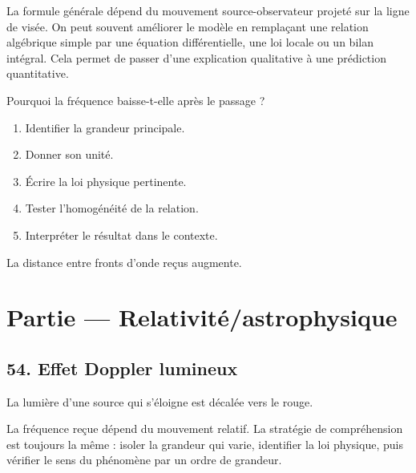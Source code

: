 \documentclass[11pt,a4paper]{article}
\begin{document}
\begin{approfondissementbox}
La formule générale dépend du mouvement source-observateur projeté sur la ligne de visée.
On peut souvent améliorer le modèle en remplaçant une relation algébrique simple par une équation différentielle, une loi locale ou un bilan intégral. Cela permet de passer d'une explication qualitative à une prédiction quantitative.
\end{approfondissementbox}

\begin{exercicebox}
Pourquoi la fréquence baisse-t-elle après le passage ?
\begin{enumerate}
  \item Identifier la grandeur principale.
  \item Donner son unité.
  \item Écrire la loi physique pertinente.
  \item Tester l'homogénéité de la relation.
  \item Interpréter le résultat dans le contexte.
\end{enumerate}
\end{exercicebox}

\begin{corrigebox}[Indication]
La distance entre fronts d'onde reçus augmente.
\end{corrigebox}


\section{Partie — Relativité/astrophysique}


\subsection{54. Effet Doppler lumineux}

\begin{exemplebox}
La lumière d'une source qui s'éloigne est décalée vers le rouge.
\end{exemplebox}

\begin{methodebox}
La fréquence reçue dépend du mouvement relatif.
La stratégie de compréhension est toujours la même : isoler la grandeur qui varie, identifier la loi physique, puis vérifier le sens du phénomène par un ordre de grandeur.
\end{methodebox}
\end{document}
